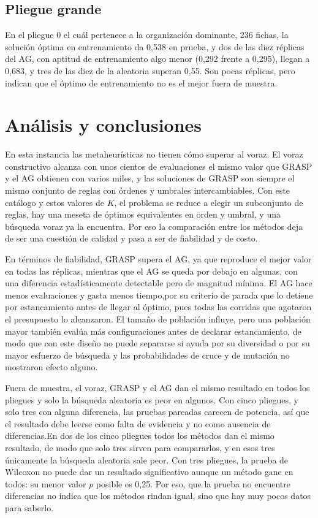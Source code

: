 \documentclass[conference]{IEEEtran}
\begin{document}
	\subsection{Pliegue grande}
	En el pliegue 0 el cuál pertenece a la organizaci\'on dominante, 236 fichas, la soluci\'on \'optima en entrenamiento da 0,538 en prueba, y dos de las diez r\'eplicas del AG, con aptitud de entrenamiento algo menor (0,292 frente a 0,295), llegan a 0,683, y tres de las diez de la aleatoria superan 0,55. Son pocas r\'eplicas, pero indican que el \'optimo de entrenamiento no es el mejor fuera de muestra.
	

	\section{An\'alisis y conclusiones}
	
	En esta instancia las metaheur\'isticas no tienen c\'omo superar al voraz. El voraz constructivo alcanza con unos cientos de evaluaciones el mismo valor que GRASP y el AG obtienen con varios miles, y las soluciones de GRASP son siempre el mismo conjunto de reglas con \'ordenes y umbrales intercambiables. Con este cat\'alogo y estos valores de $K$, el problema se reduce a elegir un subconjunto de reglas, hay una meseta de \'optimos equivalentes en orden y umbral, y una b\'usqueda voraz ya la encuentra. Por eso la comparaci\'on entre los m\'etodos deja de ser una cuesti\'on de calidad y pasa a ser de fiabilidad y de costo.
	
	En términos de fiabilidad, GRASP supera el AG, ya que reproduce el mejor valor en todas las r\'eplicas, mientras que el AG se queda por debajo en algunas, con una diferencia estad\'isticamente detectable pero de magnitud m\'inima. El AG hace menos evaluaciones y gasta menos tiempo,por su criterio de parada que lo detiene por estancamiento antes de llegar al \'optimo, pues todas las corridas que agotaron el presupuesto lo alcanzaron.  El tamaño de población influye, pero una poblaci\'on mayor tambi\'en eval\'ua m\'as configuraciones antes de declarar estancamiento, de modo que con este dise\~no no puede separarse si ayuda por su diversidad o por su mayor esfuerzo de b\'usqueda y las probabilidades de cruce y de mutaci\'on no mostraron efecto alguno.
	
	Fuera de muestra, el voraz, GRASP y el AG dan el mismo resultado en todos los pliegues y solo la b\'usqueda aleatoria es peor en algunos. Con cinco pliegues, y solo tres con alguna diferencia, las pruebas pareadas carecen de potencia, as\'i que el resultado debe leerse como falta de evidencia y no como ausencia de diferencias.En dos de los cinco pliegues todos los m\'etodos dan el mismo resultado, de modo que solo tres sirven para compararlos, y en esos tres \'unicamente la b\'usqueda aleatoria sale peor. Con tres pliegues, la prueba de Wilcoxon no puede dar un resultado significativo aunque un m\'etodo gane en todos: su menor valor $p$ posible es 0,25. Por eso, que la prueba no encuentre diferencias no indica que los m\'etodos rindan igual, sino que hay muy pocos datos para saberlo.
	
\end{document}
